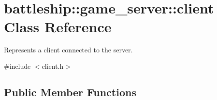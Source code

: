 \hypertarget{classbattleship_1_1game__server_1_1client}{}\section{battleship\+:\+:game\+\_\+server\+:\+:client Class Reference}
\label{classbattleship_1_1game__server_1_1client}


Represents a client connected to the server.  




{\ttfamily \#include $<$client.\+h$>$}

\subsection*{Public Member Functions}
